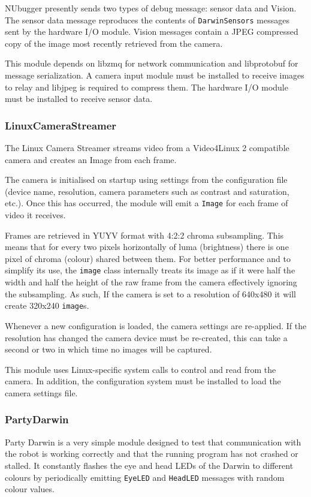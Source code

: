 \documentclass[english,12pt]{scrartcl}
\begin{document}
				NUbugger presently sends two types of debug message: sensor data and Vision.
				The sensor data message reproduces the contents of \texttt{DarwinSensors}
				messages sent by the hardware I/O module. Vision messages contain a JPEG
				compressed copy of the image most recently retrieved from the camera.
				
				This module depends on libzmq for network communication and libprotobuf for
				message serialization. A camera input module must be installed to receive
				images to relay and libjpeg is required to compress them. The hardware I/O
				module must be installed to receive sensor data.
				
				
			\subsubsection{LinuxCameraStreamer}
				The Linux Camera Streamer streams video from a Video4Linux 2 compatible camera and
				creates an Image from each frame.
				
				The camera is initialised on startup using settings from the configuration
				file (device name, resolution, camera parameters such as contrast and
				saturation, etc.). Once this has occurred, the module will emit a
				\texttt{Image} for each frame of video it receives.
				
				Frames are retrieved in YUYV format with 4:2:2 chroma subsampling. This means
				that for every two pixels horizontally of luma (brightness) there is one pixel
				of chroma (colour) shared between them. For better performance and to simplify
				its use, the \texttt{image} class internally treats its image as if it were half
				the width and half the height of the raw frame from the camera effectively
				ignoring the subsampling. As such, If the camera is set to a resolution of
				640x480 it will create 320x240 \texttt{image}s.
				
				Whenever a new configuration is loaded, the camera settings are re-applied. If
				the resolution has changed the camera device must be re-created, this can take
				a second or two in which time no images will be captured.
				
				This module uses Linux-specific system calls to control and read from the camera.
				In addition, the configuration system must be installed to load the camera settings file.
				
				
			\subsubsection{PartyDarwin}
				Party Darwin is a very simple module designed to test that communication with the
				robot is working correctly and that the running program has not crashed or
				stalled. It constantly flashes the eye and head LEDs of the Darwin to different
				colours by periodically emitting \texttt{EyeLED} and \texttt{HeadLED} messages
				with random colour values.
				
\end{document}
